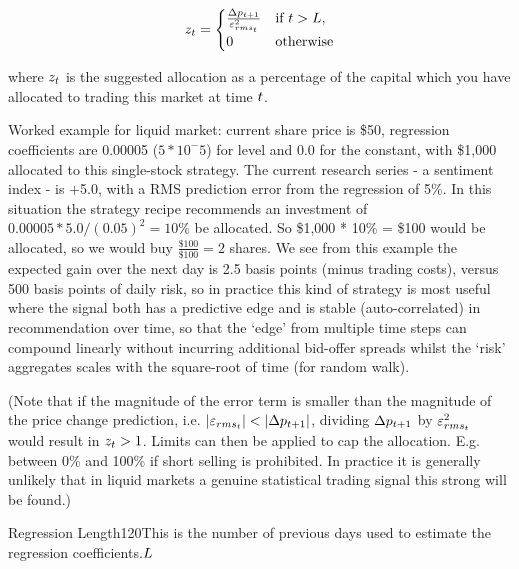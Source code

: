 \documentclass{article}%
\begin{document}
\vspace{1mm}
\begin{equation}
    z_t =
    \begin{cases}
    \frac{\Delta p_{t+1}}{\varepsilon^{{2}}_{rms_{t}}} & \text{if } t > L,\\
    0                                        & \text{otherwise}
    \end{cases}
\end{equation}



\vspace{1mm}
\justify where $z_t$ is the suggested allocation as a percentage of the capital which you have allocated to trading this market at time $t$.

\justify Worked example for liquid market:  current share price is \$50, regression coefficients are 0.00005 ($5 * 10^-5$) for level and 0.0 for the constant, with \$1,000 allocated to this single-stock strategy.  The current research series - a sentiment index - is +5.0, with a RMS prediction error from the regression of 5\%. In this situation the strategy recipe recommends an investment of $0.00005 * 5.0 / (0.05)^2 = 10\%$ be allocated. So \$1,000 * 10\% = \$100 would be allocated, so we would buy $\frac{\$100}{\$100} = 2$ shares.
We see from this example the expected gain over the next day is 2.5 basis points (minus trading costs), versus 500 basis points of daily risk, so in practice this kind of strategy is most useful where the signal both has a predictive edge and is stable (auto-correlated) in recommendation over time, so that the `edge' from multiple time steps can compound linearly without incurring additional bid-offer spreads whilst the `risk' aggregates scales with the square-root of time (for random walk).


\vspace{1mm}
\justify (Note that if the magnitude of the error term is smaller than the magnitude of the price change prediction, i.e. $|\varepsilon_{rms_{t}}| < |\Delta p_{t+1}|$, dividing $\Delta p_{t+1}$ by $\varepsilon^{{2}}_{rms_{t}}$ would result in $z_t>1$. Limits can then be applied to cap the allocation. E.g. between 0\% and 100\% if short selling is prohibited. In practice it is generally unlikely that in liquid markets a genuine statistical trading signal this strong will be found.)

\fixedruleparameters
{Regression Length}{120}{This is the number of previous days used to estimate the regression coefficients.}{$L$}%
\stoptable 
\end{document}
